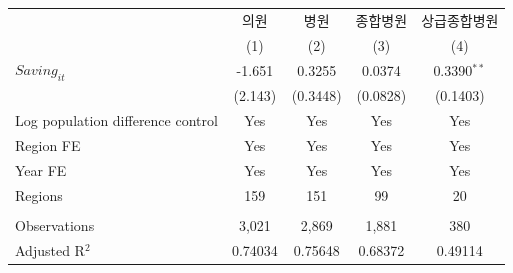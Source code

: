 \begingroup
\centering
\begin{tabular}{lcccc}
   \toprule
                                     & 의원    & 병원     & 종합병원 & 상급종합병원 \\   
                                     & (1)     & (2)      & (3)      & (4)\\  
   \midrule 
   $Saving_{it}$                     & -1.651  & 0.3255   & 0.0374   & 0.3390$^{**}$\\   
                                     & (2.143) & (0.3448) & (0.0828) & (0.1403)\\   
   Log population difference control & Yes     & Yes      & Yes      & Yes\\  
   Region FE                         & Yes     & Yes      & Yes      & Yes\\  
   Year FE                           & Yes     & Yes      & Yes      & Yes\\  
   Regions                           & 159     & 151      & 99       & 20\\  
    \\
   Observations                      & 3,021   & 2,869    & 1,881    & 380\\  
   Adjusted R$^2$                    & 0.74034 & 0.75648  & 0.68372  & 0.49114\\  
   \bottomrule
\end{tabular}
\par\endgroup
